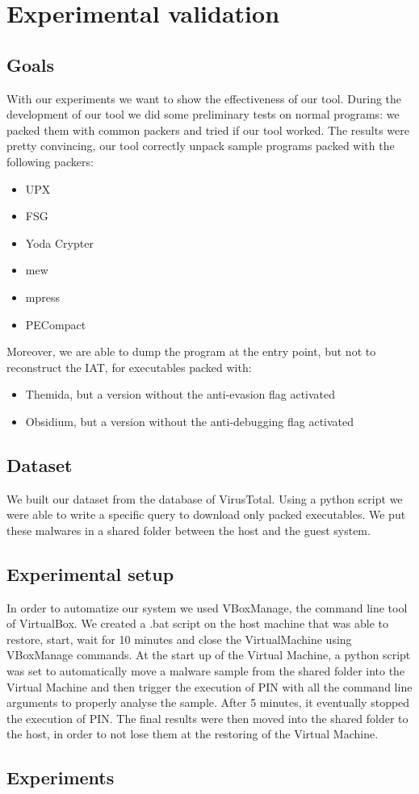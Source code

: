 \chapter{Experimental validation}
\label{chapter5}
\thispagestyle{empty}

\section{Goals}
With our experiments we want to show the effectiveness of our tool. During the development of our tool we did some preliminary tests on normal programs: we packed them with common packers and tried if our tool worked. The results were pretty convincing, our tool correctly unpack sample programs packed with the following packers:
\begin{itemize}
\item UPX
\item FSG
\item Yoda Crypter
\item mew
\item mpress
\item PECompact
\end{itemize}
Moreover, we are able to dump the program at the entry point, but not to reconstruct the IAT, for executables packed with:
\begin{itemize}
\item Themida, but a version without the anti-evasion flag activated
\item Obsidium, but a version without the anti-debugging flag activated
\end{itemize}

\section{Dataset}
We built our dataset from the database of VirusTotal. Using a python script we were able to write a specific query to download only packed executables. We put these malwares in a shared folder between the host and the guest system.

\section{Experimental setup}
In order to automatize our system we used VBoxManage, the command line tool of VirtualBox. We created a .bat script on the host machine that was able to restore, start, wait for 10 minutes and close the VirtualMachine using VBoxManage commands. At the start up of the Virtual Machine, a python script was set to automatically move a malware sample from the shared folder into the Virtual Machine and then trigger the execution of PIN with all the command line arguments to properly analyse the sample. After 5 minutes, it eventually stopped the execution of PIN. The final results were then moved into the shared folder to the host, in order to not lose them at the restoring of the Virtual Machine.

\section{Experiments}


